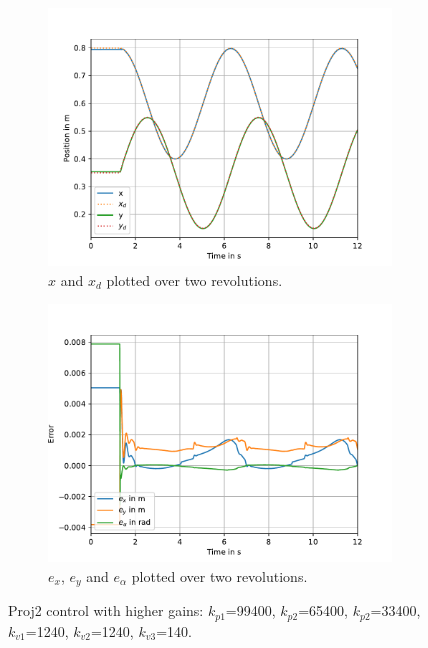 \begin{figure}[H]
    \centering
    \begin{subfigure}[t]{0.48\textwidth}
        \centering
        \includegraphics[width=\textwidth]{SRC/CircleTraj_large_kp_x_x_d.pdf} %
        \caption{$x$ and $x_d$ plotted over two revolutions.}
        \label{fig:LargeKpCircXD}
    \end{subfigure}
    \hfill
    \begin{subfigure}[t]{0.48\textwidth}
        \centering
        \includegraphics[width=\textwidth]{SRC/CircleTraj_large_kp_exeyea.pdf} %
        \caption{$e_x$, $e_y$ and $e_\alpha$ plotted over two revolutions.}
        \label{fig:LargeKpCircEX}
    \end{subfigure}
    
    \caption{Proj2 control with higher gains: $k_{p1}$=99400, $k_{p2}$=65400, $k_{p2}$=33400, $k_{v1}$=1240, $k_{v2}$=1240, $k_{v3}$=140.}
    \label{fig:LargeKpCirc}
\end{figure}



